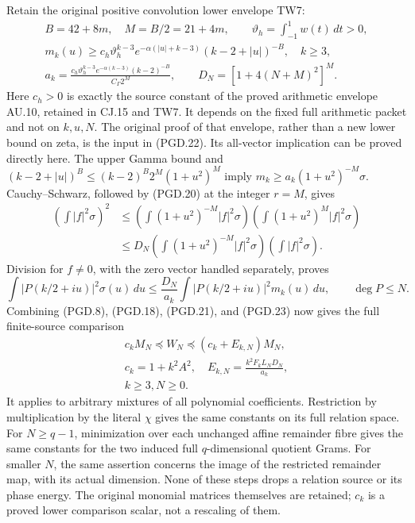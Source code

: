 Retain the original positive convolution lower envelope TW7:
\[
 \begin{gathered}
 B=42+8m,\quad M=B/2=21+4m,\qquad
 \vartheta_h=\int_{-1}^1w(t)\,dt>0,\\
 m_k(u)\geq c_h\vartheta_h^{k-3}
       e^{-\alpha(|u|+k-3)}(k-2+|u|)^{-B},\quad k\geq3,\\
 a_k=\frac{c_h\vartheta_h^{k-3}e^{-\alpha(k-3)}(k-2)^{-B}}
                   {C_\Gamma2^M},\qquad
 D_N=[1+4(N+M)^2]^M.
 \end{gathered}
 \tag{PGD.22}\label{GraphV2:eq:pgd-original-lower}
\]
Here \(c_h>0\) is exactly the source constant of the proved arithmetic
envelope AU.10, retained in CJ.15 and TW7. It depends on the fixed
full arithmetic packet and not on \(k,u,N\). The original proof of
that envelope, rather than a new lower bound on zeta, is the input in
(PGD.22). Its all-vector implication can be proved directly here.
The upper Gamma bound and
\((k-2+|u|)^B\leq(k-2)^B2^M(1+u^2)^M\) imply
\(m_k\geq a_k(1+u^2)^{-M}\sigma\).
Cauchy--Schwarz, followed by (PGD.20) at the integer \(r=M\), gives
\[
 \begin{split}
 \left(\int|f|^2\sigma\right)^2
 &\leq\left(\int(1+u^2)^{-M}|f|^2\sigma\right)
       \left(\int(1+u^2)^M|f|^2\sigma\right)\\
 &\leq D_N\left(\int(1+u^2)^{-M}|f|^2\sigma\right)
                   \left(\int|f|^2\sigma\right).
 \end{split}
\]
Division for \(f\ne0\), with the zero vector handled separately,
proves
\[
 \int|P(k/2+iu)|^2\sigma(u)\,du
 \leq\frac{D_N}{a_k}
           \int|P(k/2+iu)|^2m_k(u)\,du,\qquad \deg P\leq N.
 \tag{PGD.23}\label{GraphV2:eq:pgd-sigma-to-actual}
\]
Combining (PGD.8), (PGD.18), (PGD.21), and (PGD.23) now gives
the full finite-source comparison
\[
 \boxed{\begin{gathered}
 c_kM_N\preceq W_N\preceq(c_k+E_{k,N})M_N,\\
 c_k=1+k^2A^2,\quad
 E_{k,N}=\frac{k^2F_kL_ND_N}{a_k},\\
 k\geq3, N\geq0.
 \end{gathered}}
 \tag{PGD.24}\label{GraphV2:eq:pgd-full-window}
\]
It applies to arbitrary mixtures of all polynomial coefficients.
Restriction by multiplication by the literal \(\chi\) gives the same
constants on its full relation space. For \(N\geq q-1\), minimization
over each unchanged affine remainder fibre gives the same constants
for the two induced full \(q\)-dimensional quotient Grams. For smaller
\(N\), the same assertion concerns the image of the restricted
remainder map, with its actual dimension. None of these steps drops a relation source or its
phase energy. The original monomial matrices themselves are retained;
\(c_k\) is a proved lower comparison scalar, not a rescaling of them.


